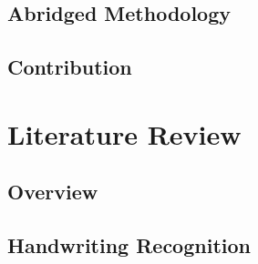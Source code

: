 \documentclass[12pt, twoside]{report}
\begin{document}
\section{Abridged Methodology}
\lipsum[1-1]


\section{Contribution}
\lipsum[1-1]



\chapter{Literature Review} 
\thispagestyle{empty}
\section{Overview}
\lipsum[1-1]
\section{Handwriting Recognition}


\end{document}
